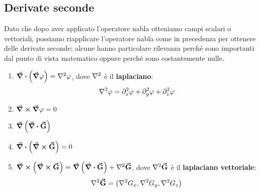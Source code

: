 \subsection{Derivate seconde}
Dato che dopo aver applicato l'operatore nabla otteniamo campi scalari o vettoriali, possiamo riapplicare l'operatore nabla come in precedenza per ottenere delle derivate seconde; alcune hanno particolare rilevanza perché sono importanti dal punto di vista matematico oppure perché sono costantemente nulle.
\begin{enumerate}[label=\roman*)]
	\item  $\div{\left(\grad\phi\right)}=\laplacian{\phi}$, dove $\laplacian$ è il \textbf{laplaciano}:
	\begin{equation}
		\laplacian{\phi}=\partial^2_x\phi+\partial^2_y\phi+\partial^2_z\phi\label{laplacianocartesiano}
	\end{equation}
	\item $\curl{\grad{\varphi}}=0$
	\item $\grad{\left(\div{\vb*{\va{G}}}\right)}$
	\item $\div{\left(\curl{\vb*{\va{G}}}\right)}=0$
	\item $\curl{\left(\curl{\vba{G}}\right)}=\grad{\left(\div{\vba{G}}\right)}+\laplacian{\vba{G}}$, dove $\laplacian{\vba{G}}$ è il \textbf{laplaciano vettoriale}:
	\begin{equation}
		\laplacian{\vba{G}}=\left(\laplacian{G_x},\laplacian{G_y},\laplacian{G_z}\right)
	\end{equation}
\end{enumerate}

